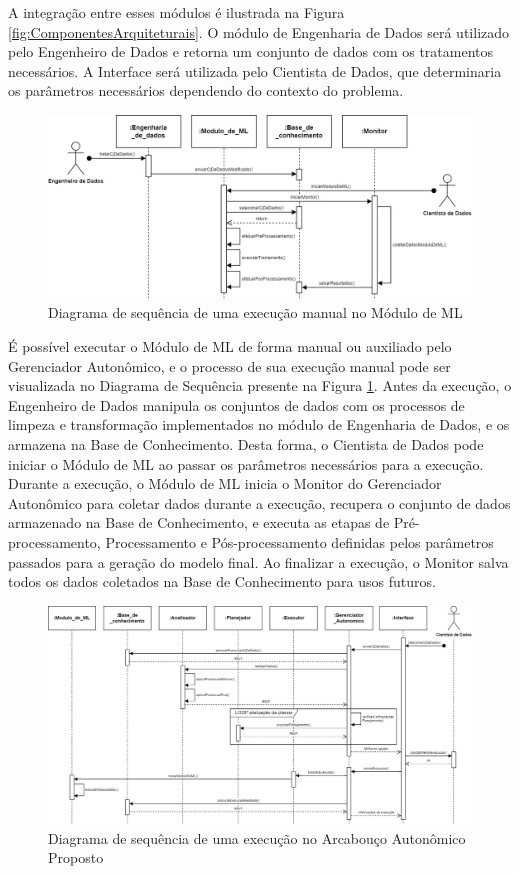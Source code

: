 \documentclass[portugues]{ic-tese}
\begin{document}
A integração entre esses módulos é ilustrada na Figura \ref{fig:ComponentesArquiteturais}. O módulo de Engenharia de Dados será utilizado pelo Engenheiro de Dados e retorna um conjunto de dados com os tratamentos necessários. A Interface será utilizada pelo Cientista de Dados, que determinaria os parâmetros necessários dependendo do contexto do problema. 

\begin{figure}[h]
\centering
\includegraphics[scale=0.375]{images/Diagrama_Sequencia_Manual.jpg}
\caption {Diagrama de sequência de uma execução manual no Módulo de ML}
\label{fig:DiagramaSequenciaManual}
\end{figure}

É possível executar o Módulo de ML de forma manual ou auxiliado pelo Gerenciador Autonômico, e o processo de sua execução manual pode ser visualizada no Diagrama de Sequência presente na Figura \ref{fig:DiagramaSequenciaManual}. Antes da execução, o Engenheiro de Dados manipula os conjuntos de dados com os processos de limpeza e transformação implementados no módulo de Engenharia de Dados, e os armazena na Base de Conhecimento. Desta forma, o Cientista de Dados pode iniciar o Módulo de ML ao passar os parâmetros necessários para a execução. Durante a execução, o Módulo de ML inicia o Monitor do Gerenciador Autonômico para coletar dados durante a execução, recupera o conjunto de dados armazenado na Base de Conhecimento, e executa as etapas de Pré-processamento, Processamento e Pós-processamento definidas pelos parâmetros passados para a geração do modelo final. Ao finalizar a execução, o Monitor salva todos os dados coletados na Base de Conhecimento para usos futuros.

\begin{figure}
\clearpage
\includegraphics[scale=0.445]{images/Diagrama_Sequencia_Auto.jpg}
\caption {Diagrama de sequência de uma execução no Arcabouço Autonômico Proposto}
\label{fig:DiagramaSequenciaAuto}
\end{figure}
\end{document}
